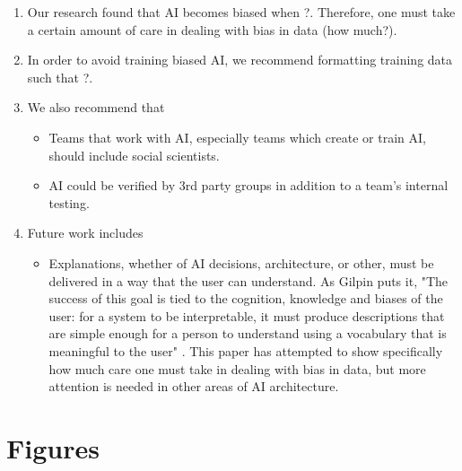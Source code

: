 \documentclass{report}
\begin{document}
\begin{enumerate}
    \item Our research found that AI becomes biased when ?. Therefore, one must take a certain
    amount of care in dealing with bias in data (how much?).
    
    \item In order to avoid training biased AI, we recommend formatting training data such that ?.
    
    \item We also recommend that
    \begin{itemize}
        \item Teams that work with AI, especially teams which create or train AI, should include
        social scientists.
        
        \item AI could be verified by 3rd party groups in addition to a team's internal testing.
    \end{itemize}

    \item Future work includes
    \begin{itemize}
        \item Explanations, whether of AI decisions, architecture, or other, must be delivered in a
        way that the user can understand. As Gilpin puts it, "The success of this goal is tied to
        the cognition, knowledge and biases of the user: for a system to be interpretable, it must
        produce descriptions that are simple enough for a person to understand using a vocabulary
        that is meaningful to the user" \cite{gilpin2018explaining}. This paper has attempted to
        show specifically how much care one must take in dealing with bias in data, but more
        attention is needed in other areas of AI architecture.
    \end{itemize}
\end{enumerate}




\appendix
\chapter{Figures}
\end{document}
